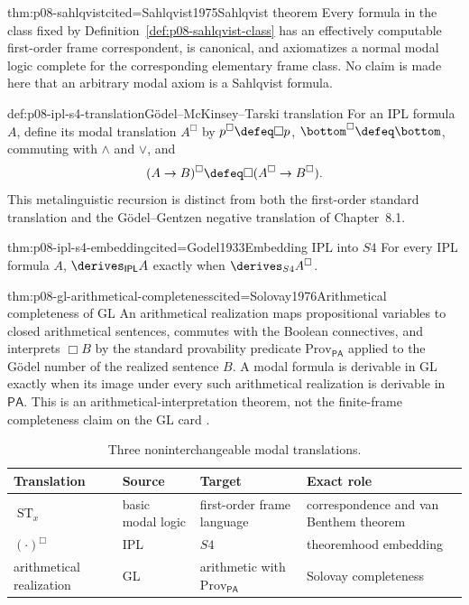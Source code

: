 \begin{hbtheorem}{thm:p08-sahlqvist}{cited=Sahlqvist1975}{Sahlqvist theorem}
Every formula in the class fixed by
Definition~\ref{def:p08-sahlqvist-class} has an effectively computable
first-order frame correspondent, is canonical, and axiomatizes a normal modal
logic complete for the corresponding elementary frame class.  No claim is
made here that an arbitrary modal axiom is a Sahlqvist formula.
\end{hbtheorem}

\begin{hbdefinition}{def:p08-ipl-s4-translation}{G\"odel--McKinsey--Tarski translation}
For an IPL formula \(A\), define its modal translation \(A^{\Box}\) by
\(p^{\Box}\defeq\Box p\), \(\bottom^{\Box}\defeq\bottom\), commuting with
\(\land\) and \(\lor\), and
\[
 (A\to B)^{\Box}\defeq\Box(A^{\Box}\to B^{\Box}).
\]
This metalinguistic recursion is distinct from both the first-order standard
translation and the G\"odel--Gentzen negative translation of Chapter~8.1.
\end{hbdefinition}

\begin{hbtheorem}{thm:p08-ipl-s4-embedding}{cited=Godel1933}{Embedding IPL into \(S4\)}
For every IPL formula \(A\),
\(\derives_{\mathsf{IPL}}A\) exactly when
\(\derives_{S4}A^{\Box}\).
\end{hbtheorem}

\begin{hbtheorem}{thm:p08-gl-arithmetical-completeness}{cited=Solovay1976}{Arithmetical completeness of GL}
An arithmetical realization maps propositional variables to closed
arithmetical sentences, commutes with the Boolean connectives, and interprets
\(\Box B\) by the standard provability predicate
\(\mathrm{Prov}_{\mathsf{PA}}\) applied to the G\"odel number of the realized
sentence \(B\).  A modal formula is derivable in GL exactly when its image
under every such arithmetical realization is derivable in \(\mathsf{PA}\).  This is an
arithmetical-interpretation theorem, not the finite-frame completeness claim on
the GL card \cite{Boolos1993}.
\end{hbtheorem}

\begin{table}[!htbp]
\centering
\small
\begin{tabular}{@{}p{}p{}p{}p{}@{}}
\toprule
Translation & Source & Target & Exact role \\
\midrule
\(\operatorname{ST}_x\) & basic modal logic & first-order frame language &
correspondence and van Benthem theorem \\
\((\cdot)^{\Box}\) & IPL & \(S4\) & theoremhood embedding \\
arithmetical realization & GL & arithmetic with \(\mathrm{Prov}_{\mathsf{PA}}\) &
Solovay completeness \\
\bottomrule
\end{tabular}
\caption{Three noninterchangeable modal translations.}
\label{tab:p08-modal-translations}
\end{table}


